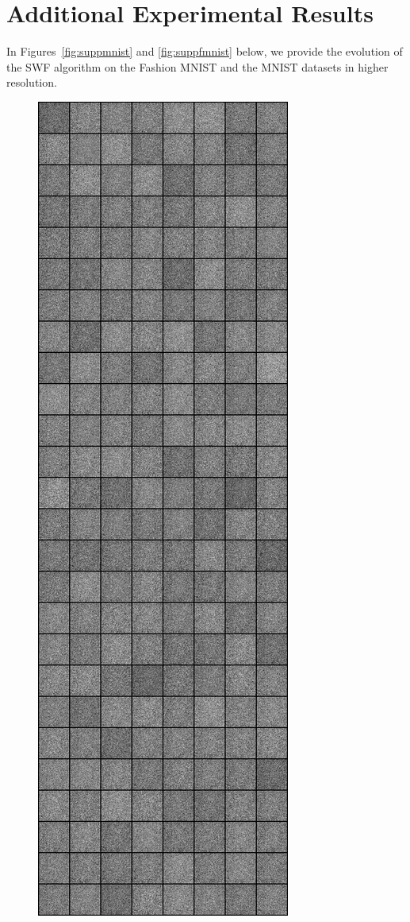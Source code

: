 


\section{Additional Experimental Results}

In Figures~\ref{fig:suppmnist} and \ref{fig:suppfmnist} below, we provide the evolution of the SWF algorithm on the Fashion MNIST and the MNIST datasets in higher resolution.

\newcommand{\picwidth}{0.15}%

\begin{figure}
\centering
\includegraphics[width=\picwidth\columnwidth]{figures/supplementary/mnist/image_0.png}

\end{figure}
